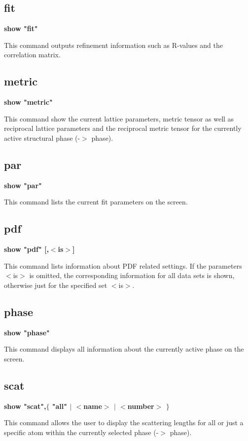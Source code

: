\subsection*{fit}
{\bf show "fit" \par }
\par
\vspace{3pt}
This command outputs refinement information such as R-values 
and the correlation matrix. 
\subsection*{metric}
{\bf show "metric" \par }
\par
\vspace{3pt}
This command show the current lattice parameters, metric tensor 
as well as reciprocal lattice parameters and the reciprocal 
metric tensor for the currently active structural phase 
(-$> $ phase). 
\subsection*{par}
{\bf show "par" \par }
\par
\vspace{3pt}
This command lists the current fit parameters on the screen. 
\subsection*{pdf}
{\bf show "pdf" [,$ <$is$> $] \par }
\par
\vspace{3pt}
This command lists information about PDF related settings. 
If the parameters $ <$is$> $ is omitted, the corresponding 
information for all data sets is shown, otherwise just for the 
specified set $ <$is$> $. 
\subsection*{phase}
{\bf show "phase" \par }
\par
\vspace{3pt}
This command displays all information about the currently 
active phase on the screen. 
\subsection*{scat}
{\bf show "scat",$ \{$ "all" $| $ $ <$name$> $ $| $ $ <$number$> $ $\} $ \par }
\par
\vspace{3pt}
This command allows the user to display the scattering lengths 
for all or just a specific atom within the currently selected 
phase (-$> $ phase). 
